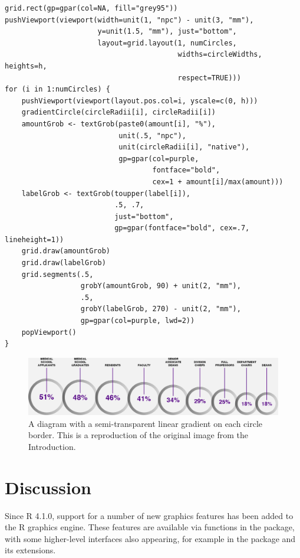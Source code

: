 \begin{verbatim}
grid.rect(gp=gpar(col=NA, fill="grey95"))
pushViewport(viewport(width=unit(1, "npc") - unit(3, "mm"),
                      y=unit(1.5, "mm"), just="bottom",
                      layout=grid.layout(1, numCircles,
                                         widths=circleWidths, heights=h, 
                                         respect=TRUE)))
for (i in 1:numCircles) {
    pushViewport(viewport(layout.pos.col=i, yscale=c(0, h)))
    gradientCircle(circleRadii[i], circleRadii[i])
    amountGrob <- textGrob(paste0(amount[i], "%"),
                           unit(.5, "npc"), 
                           unit(circleRadii[i], "native"),
                           gp=gpar(col=purple,
                                   fontface="bold",
                                   cex=1 + amount[i]/max(amount)))
    labelGrob <- textGrob(toupper(label[i]),
                          .5, .7,
                          just="bottom",
                          gp=gpar(fontface="bold", cex=.7, lineheight=1))
    grid.draw(amountGrob)
    grid.draw(labelGrob)
    grid.segments(.5,
                  grobY(amountGrob, 90) + unit(2, "mm"),
                  .5,
                  grobY(labelGrob, 270) - unit(2, "mm"),
                  gp=gpar(col=purple, lwd=2))
    popViewport()
}
\end{verbatim}

\begin{figure}[h]
\includegraphics[width=1\linewidth]{murrell-definitions-2023_files/figure-latex/gridfig-1} \caption{A diagram with a semi-transparent linear gradient on each circle border.  This is a reproduction of the original image from the Introduction.}\label{fig:gridfig}
\end{figure}

\hypertarget{discussion}{%
\section{Discussion}\label{discussion}}

Since R 4.1.0, support for a number of new graphics features has been
added to the R graphics engine. These features are available via
functions in the  package, with some higher-level interfaces
also appearing, for example in the  package and its
extensions.

